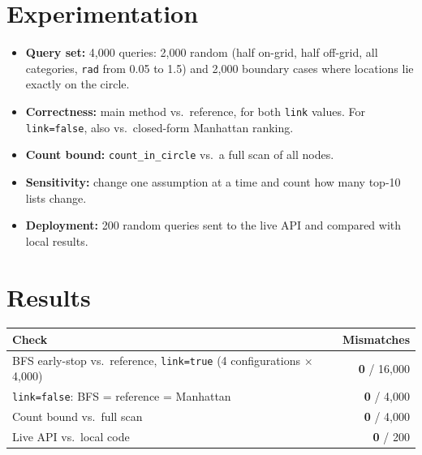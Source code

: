 \documentclass[11pt,a4paper]{article}
\newcommand{\code}[1]{\texttt{#1}}
\newcommand{\thead}{\rowcolor{accentlight}}
\begin{document}
\section{Experimentation}

\begin{itemize}
  \item \textbf{Query set:} 4{,}000 queries: 2{,}000 random (half on-grid, half off-grid, all categories,
        \code{rad} from 0.05 to 1.5) and 2{,}000 boundary cases where locations lie exactly on the circle.
  \item \textbf{Correctness:} main method vs.\ reference, for both \code{link} values.
        For \code{link=false}, also vs.\ closed-form Manhattan ranking.
  \item \textbf{Count bound:} \code{count\_in\_circle} vs.\ a full scan of all nodes.
  \item \textbf{Sensitivity:} change one assumption at a time and count how many top-10 lists change.
  \item \textbf{Deployment:} 200 random queries sent to the live API and compared with local results.
\end{itemize}

\section{Results}

\begin{center}\begin{minipage}{\textwidth}
\begin{tabularx}{\textwidth}{@{}Xr@{}}
\toprule
\thead \sffamily\bfseries Check & \sffamily\bfseries Mismatches \\
\midrule
BFS early-stop vs.\ reference, \code{link=true} (4 configurations $\times$ 4{,}000) & \textbf{0} / 16{,}000 \\
\code{link=false}: BFS = reference = Manhattan & \textbf{0} / 4{,}000 \\
Count bound vs.\ full scan & \textbf{0} / 4{,}000 \\
Live API vs.\ local code & \textbf{0} / 200 \\
\bottomrule
\end{tabularx}
\end{minipage}\end{center}
\end{document}
